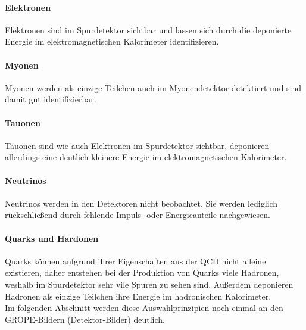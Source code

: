 \paragraph{Elektronen}
Elektronen sind im Spurdetektor sichtbar und lassen sich durch die deponierte Energie im elektromagnetischen Kalorimeter identifizieren.
\paragraph{Myonen}
Myonen werden als einzige Teilchen auch im Myonendetektor detektiert und sind damit gut identifizierbar.
\paragraph{Tauonen}
Tauonen sind wie auch Elektronen im Spurdetektor sichtbar, deponieren allerdings eine deutlich kleinere Energie im elektromagnetischen Kalorimeter.
\paragraph{Neutrinos}
Neutrinos werden in den Detektoren nicht beobachtet. Sie werden lediglich rückschließend durch fehlende Impuls- oder Energieanteile nachgewiesen.
\paragraph{Quarks und Hardonen}
Quarks können aufgrund ihrer Eigenschaften aus der QCD nicht alleine existieren, daher entstehen bei der Produktion von Quarks viele Hadronen, weshalb im Spurdetektor sehr vile Spuren zu sehen sind. Außerdem deponieren Hadronen als einzige Teilchen ihre Energie im hadronischen Kalorimeter.\\

Im folgenden Abschnitt werden diese Auswahlprinzipien noch einmal an den GROPE-Bildern (Detektor-Bilder) deutlich.